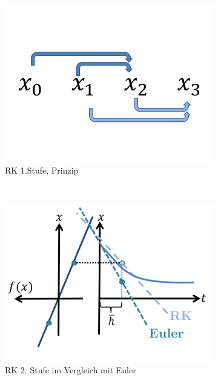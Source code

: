 \documentclass[12pt]{article}
\begin{document}
\begin{figure}[h] 
		\begin{subfigure}[h]{0.5 \textwidth}
		\centering
		\includegraphics[width=\textwidth]{Folie60.png}
		\caption{RK 1.Stufe, Prinzip} 
		\label{fig:RK1}
		\centering
	\end{subfigure}
	~
\begin{subfigure}[h]{0.5\textwidth}
		\centering
		\includegraphics[width=\textwidth]{Folie61.png}
		\caption{RK 2. Stufe im Vergleich mit Euler}
		\label{fig:RK2}
		\centering
	\end{subfigure}
	\caption{} 
\end{figure}	
\end{document}
